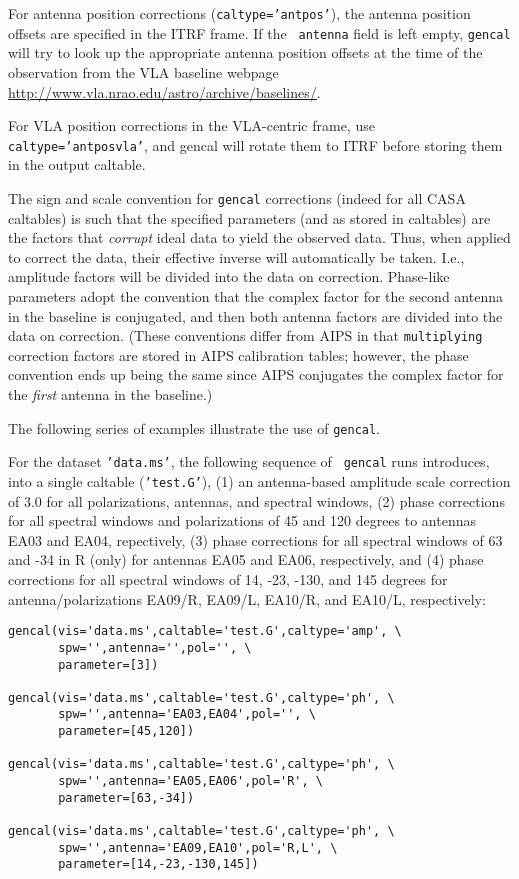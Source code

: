 For antenna position corrections ({\tt caltype='antpos'}), the antenna
position offsets are specified in the ITRF frame.  If the {\tt
  antenna} field is left empty, {\tt gencal} will try to look up the
appropriate antenna position offsets at the time of the observation
from the VLA baseline webpage
\url{http://www.vla.nrao.edu/astro/archive/baselines/}.

For VLA position corrections in the VLA-centric frame, use {\tt
  caltype='antposvla'}, and gencal will rotate them to ITRF before
storing them in the output caltable.

The sign and scale convention for {\tt gencal} corrections (indeed for
all CASA caltables) is such that the specified parameters (and as
stored in caltables) are the factors that {\em corrupt} ideal data to
yield the observed data.  Thus, when applied to correct the data,
their effective inverse will automatically be taken.  I.e., amplitude
factors will be divided into the data on correction.  Phase-like
parameters adopt the convention that the complex factor for the second
antenna in the baseline is conjugated, and then both antenna factors
are divided into the data on correction.  (These conventions differ
from AIPS in that {\tt multiplying} correction factors are stored in
AIPS calibration tables; however, the phase convention ends up being
the same since AIPS conjugates the complex factor for the {\em first}
antenna in the baseline.)

The following series of examples illustrate the use of {\tt gencal}.

For the dataset {\tt 'data.ms'}, the following sequence of {\tt
gencal} runs introduces, into a single caltable ({\tt 'test.G'}), (1)
an antenna-based amplitude scale correction of $3.0$ for all
polarizations, antennas, and spectral windows, (2) phase corrections
for all spectral windows and polarizations of 45 and 120 degrees to
antennas EA03 and EA04, repectively, (3) phase corrections for all
spectral windows of 63 and -34 in R (only) for antennas EA05 and EA06,
respectively, and (4) phase corrections for all spectral windows of
14, -23, -130, and 145 degrees for antenna/polarizations EA09/R,
EA09/L, EA10/R, and EA10/L, respectively:

\small
\begin{verbatim}
gencal(vis='data.ms',caltable='test.G',caltype='amp', \
       spw='',antenna='',pol='', \
       parameter=[3])

gencal(vis='data.ms',caltable='test.G',caltype='ph', \
       spw='',antenna='EA03,EA04',pol='', \
       parameter=[45,120])

gencal(vis='data.ms',caltable='test.G',caltype='ph', \
       spw='',antenna='EA05,EA06',pol='R', \
       parameter=[63,-34])

gencal(vis='data.ms',caltable='test.G',caltype='ph', \
       spw='',antenna='EA09,EA10',pol='R,L', \
       parameter=[14,-23,-130,145])
\end{verbatim}
\normalsize

